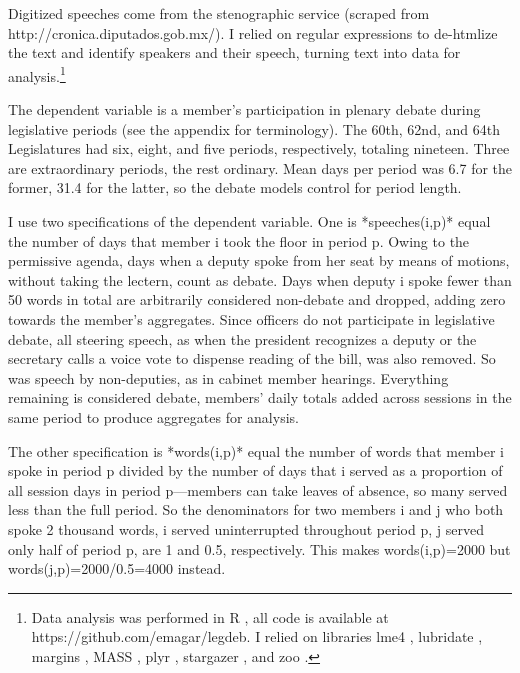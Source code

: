 \documentclass[letter,12pt]{article}
\begin{document}
Digitized speeches come from the stenographic service (scraped from http://cronica.diputados.gob.mx/). I relied on regular expressions to de-htmlize the text and identify speakers and their speech, turning text into data for analysis.\footnote{Data analysis was performed in R \citep{r.cite}, all code is available at https://github.com/emagar/legdeb. I relied on libraries lme4 \citep{r.lme4}, lubridate \citep{r.lubridate}, margins \citep{r.margins}, MASS \citep{r.mass}, plyr \citep{r.plyr}, stargazer \citep{r.stargazer}, and zoo \citep{r.zoo}.}

The dependent variable is a member's participation in plenary debate during legislative periods (see the appendix for terminology). The 60th, 62nd, and 64th Legislatures had six, eight, and five periods, respectively, totaling nineteen. Three are extraordinary periods, the rest ordinary. Mean days per period was 6.7 for the former, 31.4 for the latter, so the debate models control for period length. 

I use two specifications of the dependent variable. One is *speeches(i,p)* equal the number of days that member i took the floor in period p. Owing to the permissive agenda, days when a deputy spoke from her seat by means of motions, without taking the lectern, count as debate. Days when deputy i spoke fewer than 50 words in total are arbitrarily considered non-debate and dropped, adding zero towards the member's aggregates. Since officers do not participate in legislative debate, all steering speech, as when the president recognizes a deputy or the secretary calls a voice vote to dispense reading of the bill, was also removed. So was speech by non-deputies, as in cabinet member hearings. Everything remaining is considered debate, members' daily totals added across sessions in the same period to produce aggregates for analysis.

The other specification is *words(i,p)* equal the number of words that member i spoke in period p divided by the number of days that i served as a proportion of all session days in period p---members can take leaves of absence, so many served less than the full period. So the denominators for two members i and j who both spoke 2 thousand words, i served uninterrupted throughout period p, j served only half of period p, are 1 and 0.5, respectively. This makes words(i,p)=2000 but words(j,p)=2000/0.5=4000 instead. 

\end{document}
